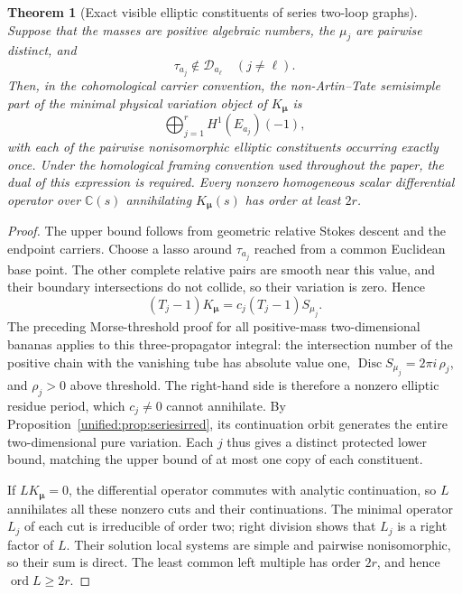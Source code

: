 \documentclass[11pt,a4paper,oneside]{article}
\theoremstyle{plain}
\newtheorem{theorem}{Theorem}[section]
\theoremstyle{definition}
\theoremstyle{remark}
\numberwithin{equation}{section}
\begin{document}
\begin{theorem}[Exact visible elliptic constituents of series two-loop graphs]\label{unified:thm:seriesvisible}
Suppose that the masses are positive algebraic numbers, the $\mu_j$ are pairwise distinct, and
\begin{equation}\label{unified:eq:seriesseparation}
 \tau_{a_j}\notin\mathcal D_{a_\ell}\quad(j\ne\ell).
\end{equation}
Then, in the cohomological carrier convention, the non-Artin--Tate semisimple part
of the minimal physical variation object of $K_{\boldsymbol\mu}$ is
\[
 \bigoplus_{j=1}^r H^1(E_{a_j})(-1),
\]
with each of the pairwise nonisomorphic elliptic constituents occurring exactly once.
Under the homological framing convention used throughout the paper, the dual of this expression is required.
Every nonzero homogeneous scalar differential operator over $\mathbb C(s)$ annihilating $K_{\boldsymbol\mu}(s)$
has order at least $2r$.
\end{theorem}
\begin{proof}
The upper bound follows from geometric relative Stokes descent and the endpoint carriers.
Choose a lasso around $\tau_{a_j}$ reached from a common Euclidean base point.
The other complete relative pairs are smooth near this value, and their boundary intersections do not collide, so their variation is zero.
Hence
\[
 (T_j-1)K_{\boldsymbol\mu}
      =c_j(T_j-1)S_{\mu_j}.
\]
The preceding Morse-threshold proof for all positive-mass two-dimensional bananas applies to this three-propagator integral:
the intersection number of the positive chain with the vanishing tube has absolute value one,
$\operatorname{Disc}S_{\mu_j}=2\pi i\,\rho_j$,
and $\rho_j>0$ above threshold. The right-hand side is therefore a nonzero elliptic residue period,
which $c_j\ne0$ cannot annihilate.
By Proposition~\ref{unified:prop:seriesirred}, its continuation orbit generates the entire two-dimensional pure variation.
Each $j$ thus gives a distinct protected lower bound, matching the upper bound of at most one copy of each constituent.

If $LK_{\boldsymbol\mu}=0$, the differential operator commutes with analytic continuation,
so $L$ annihilates all these nonzero cuts and their continuations.
The minimal operator $L_j$ of each cut is irreducible of order two;
right division shows that $L_j$ is a right factor of $L$.
Their solution local systems are simple and pairwise nonisomorphic, so their sum is direct.
The least common left multiple has order $2r$, and hence $\operatorname{ord}L\ge2r$.
\end{proof}
\end{document}
